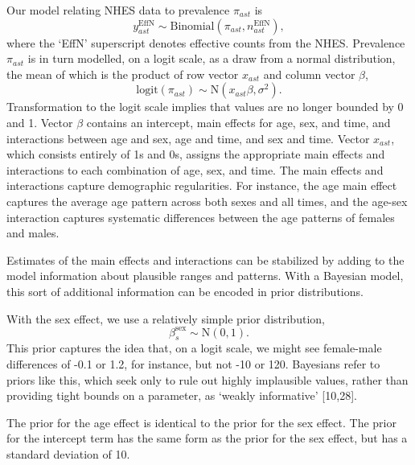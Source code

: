 \documentclass[10pt,letterpaper]{article}
\begin{document}
Our model relating NHES data to prevalence \(\pi_{ast}\) is
\begin{equation}
  y_{ast}^{\text{EffN}} \sim \text{Binomial}(\pi_{ast}, n_{ast}^{\text{EffN}}), \label{eq:syslik1}
\end{equation} where the `EffN' superscript denotes effective counts
from the NHES. Prevalence \(\pi_{ast}\) is in turn modelled, on a logit
scale, as a draw from a normal distribution, the mean of which is the
product of row vector \(x_{ast}\) and column vector \(\beta\),
\begin{equation}
  \text{logit}(\pi_{ast}) \sim \text{N}( x_{ast} \beta, \sigma^2). \label{eq:sysprior1}
\end{equation} Transformation to the logit scale implies that values are
no longer bounded by 0 and 1. Vector \(\beta\) contains an intercept,
main effects for age, sex, and time, and interactions between age and
sex, age and time, and sex and time. Vector \(x_{ast}\), which consists
entirely of 1s and 0s, assigns the appropriate main effects and
interactions to each combination of age, sex, and time. The main effects
and interactions capture demographic regularities. For instance, the age
main effect captures the average age pattern across both sexes and all
times, and the age-sex interaction captures systematic differences
between the age patterns of females and males.

Estimates of the main effects and interactions can be stabilized by
adding to the model information about plausible ranges and patterns.
With a Bayesian model, this sort of additional information can be
encoded in prior distributions.

With the sex effect, we use a relatively simple prior distribution,
\begin{equation}
  \beta_s^{\text{sex}} \sim \text{N}(0, 1).
\end{equation} This prior captures the idea that, on a logit scale, we
might see female-male differences of -0.1 or 1.2, for instance, but not
-10 or 120. Bayesians refer to priors like this, which seek only to rule
out highly implausible values, rather than providing tight bounds on a
parameter, as `weakly informative' {[}10,28{]}.

The prior for the age effect is identical to the prior for the sex
effect. The prior for the intercept term has the same form as the prior
for the sex effect, but has a standard deviation of 10.
\end{document}
